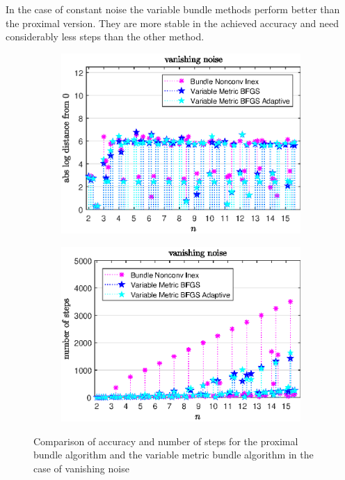 In the case of constant noise the variable bundle methods perform better than the proximal version. They are more stable in the achieved accuracy and need considerably less steps than the other method.

\begin{figure}[ht]
	\begin{subfigure}{0.49\textwidth}
		\includegraphics[width=\textwidth]{Pictures/Plots/vanishing_noise.eps}%
	\end{subfigure}
	\begin{subfigure}{0.49\textwidth}
		\includegraphics[width=\textwidth]{Pictures/Plots/steps_vanishing_noise.eps}%
	\end{subfigure}
	\caption[Accuracy and number of steps: vanishing noise]{Comparison of accuracy and number of steps for the proximal bundle algorithm and the variable metric bundle algorithm in the case of vanishing noise}%
	\label{fig_van_noise}%
\end{figure}

